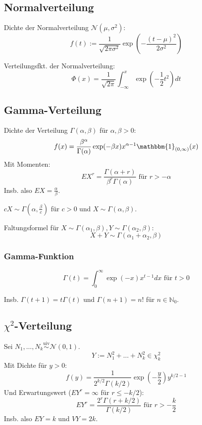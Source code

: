 \renewcommand{\N}{\mathcal{N}}
\renewcommand{\K}{\mathcal{K}}
\newcommand{\1}{\mathbbm{1}}
\newcommand{\uiv}{\stackrel{\text{uiv}}{\sim}}

\subsection*{Normalverteilung}

Dichte der Normalverteilung \(\N(\mu, \sigma^2)\):
\[ f(t) := \frac{1}{\sqrt{2\pi\sigma^2}} \exp\left( -\frac{(t-\mu)^2}{2\sigma^2} \right) \]

Verteilungsfkt. der Normalverteilung:
\[ \Phi(x) = \frac{1}{\sqrt{2\pi}} \int_{-\infty}^x \exp\left(-\frac{1}{2} t^2\right) dt \]

\subsection*{Gamma-Verteilung}

Dichte der Verteilung \(\Gamma(\alpha,\beta)\) für \(\alpha,\beta > 0\):
\[ f(x) = \frac{\beta^\alpha}{\Gamma(\alpha)} \exp(-\beta x) x^{\alpha-1} \1_{(0,\infty)}(x) \]
Mit Momenten:
\[ EX^r = \frac{\Gamma(\alpha + r)}{\beta^r \Gamma(\alpha)} \text{ für } r > -\alpha \]
Insb. also \(EX = \frac{\alpha}{\beta}\).

\(cX \sim \Gamma(\alpha,\frac{\beta}{c})\) für \(c > 0\) und \(X \sim \Gamma(\alpha,\beta)\).

Faltungsformel für \(X \sim \Gamma(\alpha_1,\beta), Y \sim \Gamma(\alpha_2,\beta)\):
\[ X + Y \sim \Gamma(\alpha_1+\alpha_2, \beta) \]

\subsubsection*{Gamma-Funktion}

\[ \Gamma(t) = \int_0^\infty \exp(-x) x^{t-1} dx \text{ für } t > 0 \]

Insb. \(\Gamma(t+1) = t\Gamma(t)\) und \(\Gamma(n+1) = n!\) für \(n \in \mathbb{N}_0\).

\subsection*{\(\chi^2\)-Verteilung}

Sei \(N_1,\dots,N_k \uiv \N(0,1)\).
\[ Y:=N_1^2+\dots+N_k^2 \in \chi_k^2 \]
Mit Dichte für \(y > 0\):
\[ f(y) = \frac{1}{2^{k/2} \Gamma(k/2)} \exp\left(-\frac{y}{2}\right) y^{k/2-1} \]
Und Erwartungswert (\(EY^r = \infty\) für \(r\leq -k/2\)):
\[ EY^r = \frac{2^r \Gamma(r+k/2)}{\Gamma(k/2)} \text{ für } r > -\frac{k}{2} \]
Insb. also \(EY = k\) und \(VY = 2k\).

